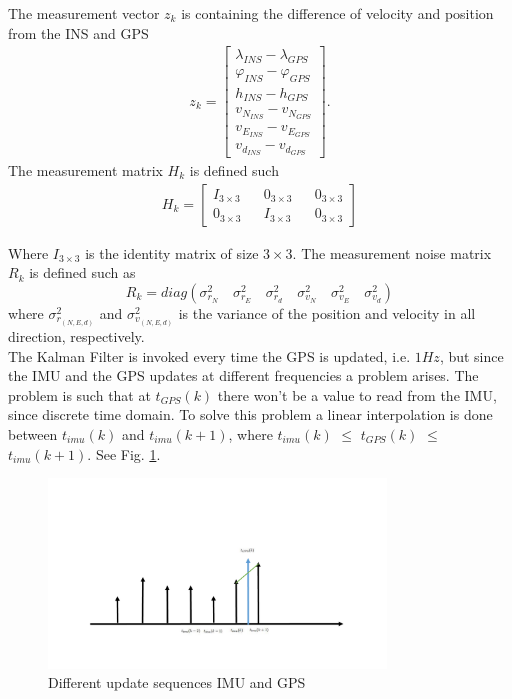 The measurement vector $z_k$ is containing the difference of velocity and position from the INS and GPS
\begin{align}
z_k =
\begin{bmatrix}
\lambda_{INS} - \lambda_{GPS} \\
\varphi_{INS} - \varphi_{GPS} \\
h_{INS} - h_{GPS} \\
v_{N_{INS}} - v_{N_{GPS}} \\
v_{E_{INS}} - v_{E_{GPS}} \\
v_{d_{INS}} - v_{d_{GPS}}
\end{bmatrix}.
\end{align}
The measurement matrix $H_k$ is defined such
\begin{align}
H_k = 
\begin{bmatrix}
I_{3\times 3} && 0_{3 \times 3} && 0_{3 \times 3} \\
0_{3 \times 3} && I_{3\times 3} && 0_{3 \times 3}
\end{bmatrix}
\end{align}

Where $I_{3\times3}$ is the identity matrix of size $3\times 3$. The measurement noise matrix $R_k$ is defined such as 
\begin{equation}
R_k = diag(\sigma_{r_N}^2 \quad \sigma_{r_E}^2 \quad \sigma_{r_d}^2 \quad \sigma_{v_N}^2 \quad \sigma_{v_E}^2 \quad \sigma_{v_d}^2)
\end{equation}
where $\sigma_{r_{(N,E,d)}}^2$ and $\sigma_{v_{(N,E,d)}}^2$ is the variance of the position and velocity in all direction, respectively.\\

The Kalman Filter is invoked every time the GPS is updated, i.e. $1Hz$, but since the IMU and the GPS updates at different frequencies a problem arises. The problem is such that at $t_{GPS}(k)$ there won't be a value to read from the IMU, since discrete time domain. To solve this problem a linear interpolation is done between $t_{imu}(k)$ and $t_{imu}(k+1)$, where $t_{imu}(k)$ $\leq$ $t_{GPS}(k)$ $\leq$  $t_{imu}(k+1)$. See Fig. \ref{Fig.different_update}.
\begin{figure}[H]
\centering
\includegraphics[width=0.8\textwidth]{Figures/linear.pdf}
\caption{Different update sequences IMU and GPS}
\label{Fig.different_update}
\end{figure}

